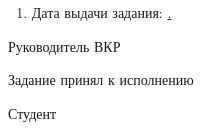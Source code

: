 \begin{enumerate}[1.]
	\item Дата выдачи задания: \uline{\thesisStartDate.}
\end{enumerate}

\intervalS%

Руководитель ВКР \uline{\hspace*{0.1\textheight} \Supervisor}


\intervalS%



\intervalS%


Задание принял к исполнению \uline{\thesisStartDate}

\intervalS%

Студент \uline{\hspace*{0.1\textheight}  \Author}



